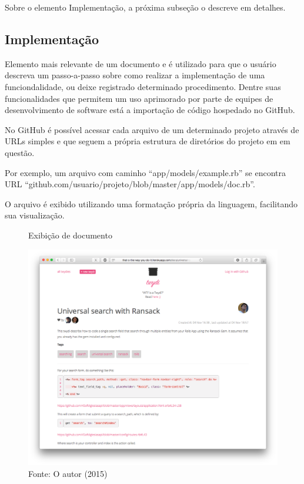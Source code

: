 Sobre o elemento Implementação, a próxima subseção o descreve em detalhes.

\subsection{Implementação}

Elemento mais relevante de um documento e é utilizado para que o usuário descreva um passo-a-passo sobre como realizar a implementação de uma funciondalidade, ou deixe registrado determinado procedimento. Dentre suas funcionalidades que permitem um uso aprimorado por parte de equipes de desenvolvimento de software está a importação de código hospedado no GitHub.

No GitHub é possível acessar cada arquivo de um determinado projeto através de URLs simples e que seguem a própria estrutura de diretórios do projeto em em questão.

Por exemplo, um arquivo com caminho ``app/models/example.rb'' se encontra URL ``github.com/usuario/projeto/blob/master/app/models/doc.rb''.

O arquivo é exibido utilizando uma formatação própria da linguagem, facilitando sua visualização.

\begin{figure}[h]
	\centering
    \caption{Exibição de documento}
    \includegraphics[width=15cm]{Imagens/print-implementation-1.png}
	\caption*{Fonte: O autor (2015)}
\end{figure}

